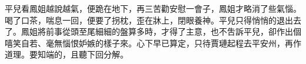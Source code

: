 \begin{parag}
    平兒看鳳姐越說越氣，便跪在地下，再三苦勸安慰一會子，鳳姐才略消了些氣惱。喝了口茶，喘息一回，便要了拐枕，歪在牀上，閉眼養神。平兒只得悄悄的退出去了。鳳姐將前事從頭至尾細細的盤算多時，才得了主意，也不吿訴平兒，卻作出個嘻笑自若、毫無惱恨妒嫉的樣子來。心下早已算定，只待賈璉起程去平安州，再作道理。要知端的，且聽下回分解。
\end{parag}

